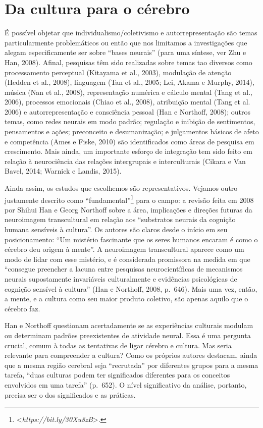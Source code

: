 \chapter{Da cultura para o cérebro}

É possível objetar que individualismo/coletivismo e autorrepresentação
são temas particularmente problemáticos ou então que nos limitamos a
investigações que alegam especificamente ser sobre ``bases neurais''
(para uma síntese, ver Zhu e Han, 2008). Afinal, pesquisas têm sido
realizadas sobre temas tao diversos como processamento perceptual
(Kitayama et al., 2003), modulação de atenção (Hedden et al., 2008),
linguagem (Tan et al., 2005; Lei, Akama e Murphy, 2014), música (Nan et
al., 2008), representação numérica e cálculo mental (Tang et al., 2006),
processos emocionais (Chiao et al., 2008), atribuição mental (Tang et
al. 2006) e autorrepresentação e consciência pessoal (Han e Northoff,
2008); outros temas, como redes neurais em modo padrão; regulação e
inibição de sentimentos, pensamentos e ações; preconceito e
desumanização; e julgamentos básicos de afeto e competência (Ames e
Fiske, 2010) são identificados como áreas de pesquisa em crescimento.
Mais ainda, um importante esforço de integração tem sido feito em
relação à neurociência das relações intergrupais e interculturais
(Cikara e Van Bavel, 2014; Warnick e Landis, 2015).

Ainda assim, os estudos que escolhemos são representativos. Vejamos
outro justamente descrito como ``fundamental''\footnote[12]{\textless{}\emph{https://bit.ly/30Xu8zB}\textgreater{}.} para
o campo: a revisão feita em 2008 por Shihui Han e Georg Northoff sobre a
área, implicações e direções futuras da neuroimagem transcultural em
relação aos ``substratos neurais da cognição humana sensíveis à
cultura''. Os autores são claros desde o início em seu posicionamento:
``Um mistério fascinante que os seres humanos encaram é como o cérebro
deu origem à mente''. A neuroimagem transcultural aparece como um modo
de lidar com esse mistério, e é considerada promissora na medida em que
``consegue preencher a lacuna entre pesquisas neurocientíficas de
mecanismos neurais supostamente invariáveis culturalmente e evidências
psicológicas de cognição sensível à cultura'' (Han e Northoff, 2008,
p.~646). Mais uma vez, então, a mente, e a cultura como seu maior produto
coletivo, são apenas aquilo que o cérebro faz.

Han e Northoff questionam acertadamente se as experiências culturais
modulam ou determinam padrões preexistentes de atividade neural. Essa é
uma pergunta crucial, comum à todas as tentativas de ligar cérebro e
cultura. Mas seria relevante para compreender a cultura? Como os
próprios autores destacam, ainda que a mesma região cerebral seja
``recrutada'' por diferentes grupos para a mesma tarefa, ``duas culturas
podem ter significados diferentes para os conceitos envolvidos em uma
tarefa'' (p.~652). O nível significativo da análise, portanto, precisa
ser o dos significados e as práticas.

